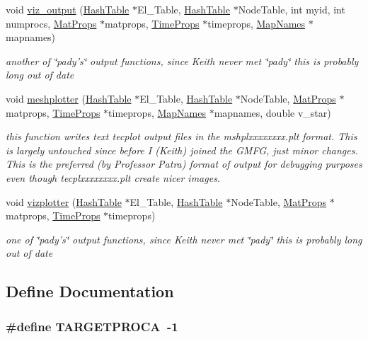 \begin{CompactItemize}
void \hyperlink{tecplot_8C_a12}{viz\_\-output} (\hyperlink{classHashTable}{Hash\-Table} $\ast$El\_\-Table, \hyperlink{classHashTable}{Hash\-Table} $\ast$Node\-Table, int myid, int numprocs, \hyperlink{structMatProps}{Mat\-Props} $\ast$matprops, \hyperlink{structTimeProps}{Time\-Props} $\ast$timeprops, \hyperlink{structMapNames}{Map\-Names} $\ast$mapnames)
\begin{CompactList}\small\item\em another of \char`\"{}pady's\char`\"{} output functions, since Keith never met \char`\"{}pady\char`\"{} this is probably long out of date \item\end{CompactList}\item 
void \hyperlink{tecplot_8C_a13}{meshplotter} (\hyperlink{classHashTable}{Hash\-Table} $\ast$El\_\-Table, \hyperlink{classHashTable}{Hash\-Table} $\ast$Node\-Table, \hyperlink{structMatProps}{Mat\-Props} $\ast$matprops, \hyperlink{structTimeProps}{Time\-Props} $\ast$timeprops, \hyperlink{structMapNames}{Map\-Names} $\ast$mapnames, double v\_\-star)
\begin{CompactList}\small\item\em this function writes text tecplot output files in the mshplxxxxxxxx.plt format. This is largely untouched since before I (Keith) joined the GMFG, just minor changes. This is the preferred (by Professor Patra) format of output for debugging purposes even though tecplxxxxxxxx.plt create nicer images. \item\end{CompactList}\item 
void \hyperlink{tecplot_8C_a14}{vizplotter} (\hyperlink{classHashTable}{Hash\-Table} $\ast$El\_\-Table, \hyperlink{classHashTable}{Hash\-Table} $\ast$Node\-Table, \hyperlink{structMatProps}{Mat\-Props} $\ast$matprops, \hyperlink{structTimeProps}{Time\-Props} $\ast$timeprops)
\begin{CompactList}\small\item\em one of \char`\"{}pady's\char`\"{} output functions, since Keith never met \char`\"{}pady\char`\"{} this is probably long out of date \item\end{CompactList}\end{CompactItemize}


\subsection{Define Documentation}
\hypertarget{tecplot_8C_a1}{
\subsubsection[TARGETPROCA]{\setlength{\rightskip}{0pt plus 5cm}\#define TARGETPROCA\ -1}}
\label{tecplot_8C_a1}


